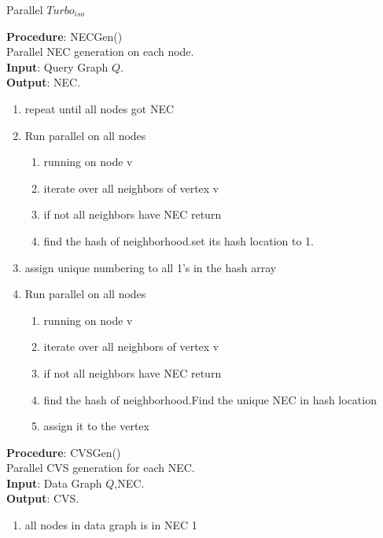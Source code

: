 \begin{breakablealgorithm}[H]
\caption{Parallel $Turbo_{iso}$}
\textbf{Procedure}: NECGen()\\
Parallel NEC generation on each node.\\
\textbf{Input}: Query Graph $Q$.\\
\textbf{Output}: NEC.\\
\begin{algorithmic}
\item \begin{enumerate}
\item repeat until all nodes got NEC
\item Run parallel on all nodes
\begin{enumerate}
\item running on node v
\item iterate over all neighbors of vertex v
\item \hspace{10mm}if not all neighbors have NEC return
\item find the hash of neighborhood.set its hash location to 1.
\end{enumerate}
\item assign unique numbering to all 1's in the hash array
\item Run parallel on all nodes
\begin{enumerate}
\item running on node v
\item iterate over all neighbors of vertex v
\item \hspace{10mm}if not all neighbors have NEC return
\item find the hash of neighborhood.Find the unique NEC in hash location
\item assign it to the vertex
\end{enumerate}
\end{enumerate}
\end{algorithmic}
\textbf{Procedure}: CVSGen()\\
Parallel CVS generation for each NEC.\\
\textbf{Input}: Data Graph $Q$,NEC.\\
\textbf{Output}: CVS.\\
\begin{algorithmic}
\item \begin{enumerate}
\item all nodes in data graph is in NEC 1

\end{enumerate}
\end{algorithmic}
\end{breakablealgorithm}
